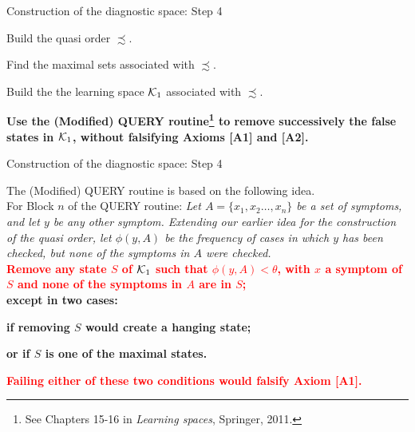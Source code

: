 \documentclass{beamer}
\def\tl{\vskip 2mm}
\def\hh{\theta}
\def\KKK{{\cal K}}
\def\pha{\phantom}
\def\rtxt#1{\textcolor{red}{#1}}
\begin{document}
\begin{frame}{Construction of the diagnostic space: Step 4}
\center
\begin{minipage}{11cm} 
\begin{roster}
\item[1.] Build the quasi order $\precsim$.
\item[2.] Find the maximal sets associated with $\precsim$. 
\item[3.]   Build the the learning space $\KKK_1$ associated with $\precsim$.
\item[4.] {\bf Use the {\sc (Modified) QUERY} routine\footnote{See  Chapters 15-16 in {\sl Learning spaces}, Springer, 2011.} to remove successively the false states in $\KKK_1$, without falsifying Axioms [A1] and [A2].} 
\end{roster}
\pha{x}

\pha{x}

\pha{x}

\pha{x}

\pha{x}
 \vspace{.5cm}

\end{minipage} 

\end{frame}
\begin{frame}{Construction of the diagnostic space: Step 4}

\center
\begin{minipage}{11cm} 
The {\sc (Modified) QUERY} routine  is  based on the following idea.\\[2mm]
For Block $n$ of the {\sc QUERY} routine:
\tl
{\sl Let $A= \{x_1,x_2\ldots,x_n\}$ be a set of symptoms, and let $y$ be any other symptom.
Extending our earlier idea for the construction of the quasi order, let $\phi(y,A)$ be the frequency of cases in which $y$ has been checked, but none of the symptoms in $A$ were checked.
} \\[2mm]
\rtxt{\bf Remove any state $S$ of $\KKK_1$ such that $\phi(y,A) < \hh$, with $x$ a symptom of $S$ and none of the symptoms in $A$ are in $S$;}\\[2mm] 
{\bf except in two cases:}

\begin{roster}
\item {\bf if removing $S$ would create a hanging state;}\\  
\item{\bf or if $S$ is one of  the maximal states.}
\end{roster}
\rtxt{\bf Failing either of these two conditions would falsify Axiom [A1].}

\end{minipage} 
 \vspace{.3cm}

\end{frame}
\end{document}
